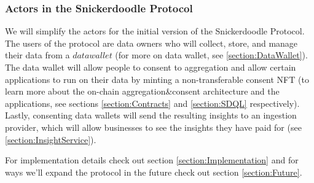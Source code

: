 \subsubsection{Actors in the Snickerdoodle Protocol}
We will simplify the actors for the initial version of the Snickerdoodle Protocol. The users of the protocol are data owners who will collect, store, and manage their data from a $\mathit{data wallet}$ (for more on data wallet, see \ref{section:DataWallet}). The data wallet will allow people to consent to aggregation and allow certain applications to run on their data by minting a non-transferable consent NFT (to learn more about the on-chain aggregation\&consent architecture and the applications, see sections \ref{section:Contracts} and \ref{section:SDQL} respectively). Lastly, consenting data wallets will send the resulting insights to an ingestion provider, which will allow businesses to see the insights they have paid for (see \ref{section:InsightService}). 


For implementation details check out section \ref{section:Implementation} and for ways we'll expand the protocol in the future check out section \ref{section:Future}.
